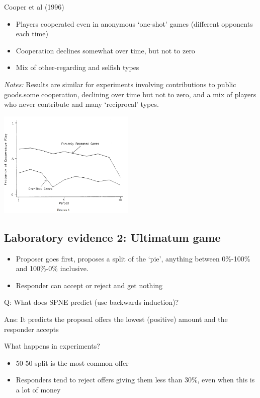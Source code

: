 \documentclass[]{article}
\providecommand{\tightlist}{%
  \setlength{\itemsep}{0pt}\setlength{\parskip}{0pt}}
\begin{document}
Cooper et al (1996)

\begin{itemize}
\tightlist
\item
  Players cooperated even in anonymous `one-shot' games (different opponents each time)
\item
  Cooperation declines somewhat over time, but not to zero
\item
  Mix of other-regarding and selfish types
\end{itemize}

\emph{Notes:} Results are similar for experiments involving contributions to public goods.some cooperation, declining over time but not to zero, and a mix of players who never contribute and many `reciprocal' types.

\includegraphics[height=2in]{picsfigs/cooperPD.png}

\hypertarget{laboratory-evidence-2-ultimatum-game}{%
\subsection{Laboratory evidence 2: Ultimatum game}\label{laboratory-evidence-2-ultimatum-game}}

\begin{itemize}
\tightlist
\item
  Proposer goes first, proposes a split of the `pie', anything between 0\%-100\% and 100\%-0\% inclusive.
\item
  Responder can accept or reject and get nothing
\end{itemize}

Q: What does SPNE predict (use backwards induction)?

Ans: It predicts the proposal offers the lowest (positive) amount and the responder accepts

\bigskip

What happens in experiments?

\begin{itemize}
\tightlist
\item
  50-50 split is the most common offer
\item
  Responders tend to reject offers giving them less than 30\%, even when this is a lot of money
\end{itemize}
\end{document}
